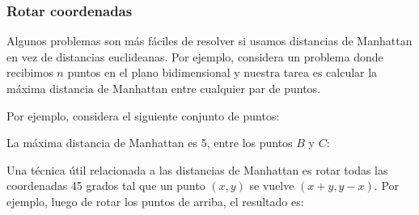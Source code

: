 \subsubsection{Rotar coordenadas}

Algunos problemas son más fáciles de resolver si usamos distancias de
Manhattan en vez de distancias euclideanas. Por ejemplo, considera un problema
donde recibimos $n$ puntos en el plano bidimensional y nuestra tarea es
calcular la máxima distancia de Manhattan entre cualquier par de puntos.

Por ejemplo, considera el siguiente conjunto de puntos:
\begin{center}
\end{center}
\pagebreak
La máxima distancia de Manhattan es 5, entre los puntos $B$ y $C$:
\begin{center}
\end{center}

Una técnica útil relacionada a las distancias de Manhattan es rotar todas
las coordenadas 45 grados tal que un punto $(x,y)$ se vuelve $(x+y,y-x)$.
Por ejemplo, luego de rotar los puntos de arriba, el resultado es:

